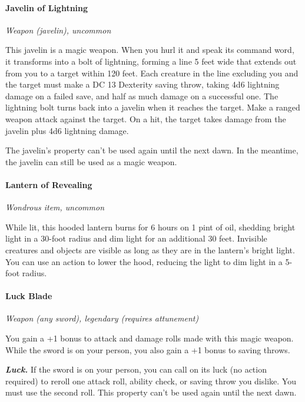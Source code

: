 \documentclass[
]{article}
\begin{document}
\hypertarget{javelin-of-lightning}{%
\paragraph{Javelin of Lightning}\label{javelin-of-lightning}}

\emph{Weapon (javelin), uncommon}

This javelin is a magic weapon. When you hurl it and speak its command
word, it transforms into a bolt of lightning, forming a line 5 feet wide
that extends out from you to a target within 120 feet. Each creature in
the line excluding you and the target must make a DC 13 Dexterity saving
throw, taking 4d6 lightning damage on a failed save, and half as much
damage on a successful one. The lightning bolt turns back into a javelin
when it reaches the target. Make a ranged weapon attack against the
target. On a hit, the target takes damage from the javelin plus 4d6
lightning damage.

The javelin's property can't be used again until the next dawn. In the
meantime, the javelin can still be used as a magic weapon.

\hypertarget{lantern-of-revealing}{%
\paragraph{Lantern of Revealing}\label{lantern-of-revealing}}

\emph{Wondrous item, uncommon}

While lit, this hooded lantern burns for 6 hours on 1 pint of oil,
shedding bright light in a 30-foot radius and dim light for an
additional 30 feet. Invisible creatures and objects are visible as long
as they are in the lantern's bright light. You can use an action to
lower the hood, reducing the light to dim light in a 5-foot radius.

\hypertarget{luck-blade}{%
\paragraph{Luck Blade}\label{luck-blade}}

\emph{Weapon (any sword), legendary (requires attunement)}

You gain a +1 bonus to attack and damage rolls made with this magic
weapon. While the sword is on your person, you also gain a +1 bonus to
saving throws.

\emph{\textbf{Luck.}} If the sword is on your person, you can call on
its luck (no action required) to reroll one attack roll, ability check,
or saving throw you dislike. You must use the second roll. This property
can't be used again until the next dawn.
\end{document}
